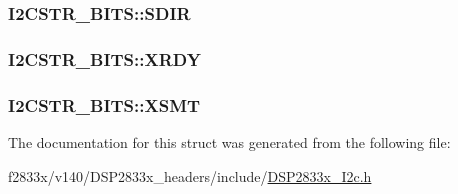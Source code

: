 \subsubsection[{S\+D\+I\+R}]{ I2\+C\+S\+T\+R\+\_\+\+B\+I\+T\+S\+::\+S\+D\+I\+R}\label{struct_i2_c_s_t_r___b_i_t_s_add76c8dbfe1e8040a9d3222d45e2715e}
\hypertarget{struct_i2_c_s_t_r___b_i_t_s_a9aba77dabb5660ab8f6b7f31da075749}{}
\subsubsection[{X\+R\+D\+Y}]{ I2\+C\+S\+T\+R\+\_\+\+B\+I\+T\+S\+::\+X\+R\+D\+Y}\label{struct_i2_c_s_t_r___b_i_t_s_a9aba77dabb5660ab8f6b7f31da075749}
\hypertarget{struct_i2_c_s_t_r___b_i_t_s_ae112827427b81bd35f8d180bd94f32c8}{}
\subsubsection[{X\+S\+M\+T}]{ I2\+C\+S\+T\+R\+\_\+\+B\+I\+T\+S\+::\+X\+S\+M\+T}\label{struct_i2_c_s_t_r___b_i_t_s_ae112827427b81bd35f8d180bd94f32c8}


The documentation for this struct was generated from the following file\+:\begin{DoxyCompactItemize}
\item 
f2833x/v140/\+D\+S\+P2833x\+\_\+headers/include/\hyperlink{_d_s_p2833x___i2c_8h}{D\+S\+P2833x\+\_\+\+I2c.\+h}\end{DoxyCompactItemize}
